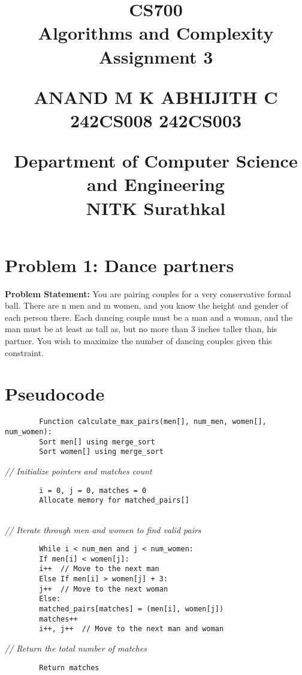\documentclass[a4paper,12pt]{report}
\title{
  \vspace{-2em} %
  \textbf{CS700 \\ Algorithms and Complexity} \\ %
  \large \textbf{Assignment 3} \\ %
  \vspace{1em} %
\begin{center}
	\textbf{ANAND M K} \hspace{3cm} \textbf{ABHIJITH C} \\ %
	242CS008 \hspace{4cm} 242CS003 %
\end{center}


  Department of Computer Science and Engineering \\ NITK Surathkal
}
\date{} %
\begin{document}
\maketitle

\section*{Problem 1: Dance partners}

\large \textbf{Problem Statement:}  
You are pairing couples for a very conservative formal ball. There are n men and m women, and you know the height and gender of each person there. Each dancing couple must be a man and a woman, and the man must be at least as tall as, but no more than 3 inches taller than, his partner. You wish to maximize the number of dancing couples given this constraint.  

\section*{Pseudocode}

\begin{tcolorbox}[colback=white, colframe=black, boxrule=0.5pt] %
	\ttfamily\small  %
	\begin{verbatim}
		Function calculate_max_pairs(men[], num_men, women[], num_women):
		Sort men[] using merge_sort
		Sort women[] using merge_sort
	\end{verbatim}
	\textit{\color{gray} // Initialize pointers and matches count}
	\begin{verbatim}
		i = 0, j = 0, matches = 0
		Allocate memory for matched_pairs[]
		
	\end{verbatim}
	\textit{\color{gray} // Iterate through men and women to find valid pairs}
	\begin{verbatim}
		While i < num_men and j < num_women:
		If men[i] < women[j]:
		i++  // Move to the next man
		Else If men[i] > women[j] + 3:
		j++  // Move to the next woman
		Else:
		matched_pairs[matches] = (men[i], women[j])
		matches++
		i++, j++  // Move to the next man and woman
	\end{verbatim}
	\textit{\color{gray} // Return the total number of matches}
	\begin{verbatim}
		Return matches
	\end{verbatim}
\end{tcolorbox}
\end{document}
